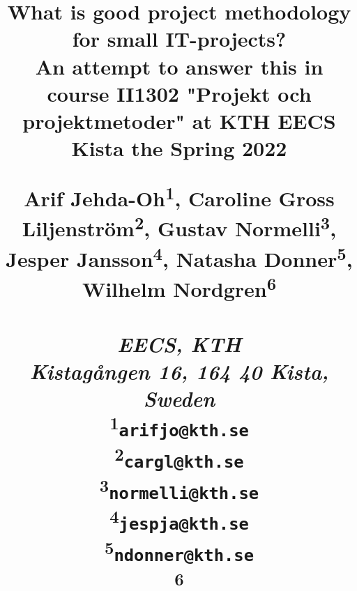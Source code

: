 \title{
    What is good project methodology for small IT-projects?\\
{\normalsize An attempt to answer this in course II1302 "Projekt och projektmetoder"
at KTH EECS Kista the Spring 2022}

\begin{center}
    \large{ 
        Arif Jehda-Oh\textsuperscript{1}, Caroline Gross Liljenström\textsuperscript{2}, Gustav Normelli\textsuperscript{3}, Jesper Jansson\textsuperscript{4}, Natasha Donner\textsuperscript{5}, Wilhelm Nordgren\textsuperscript{6}\\
        \textit{\\EECS, KTH\\
                Kistagången 16, 164 40 Kista, Sweden\\}
        \textsuperscript{1}\texttt{arifjo@kth.se}\\
        \textsuperscript{2}\texttt{cargl@kth.se}\\
        \textsuperscript{3}\texttt{normelli@kth.se}\\
        \textsuperscript{4}\texttt{jespja@kth.se}\\
        \textsuperscript{5}\texttt{ndonner@kth.se}\\
        \textsuperscript{6}\texttt{}\\
        
    }
\end{center}
}

\author{}




\maketitle